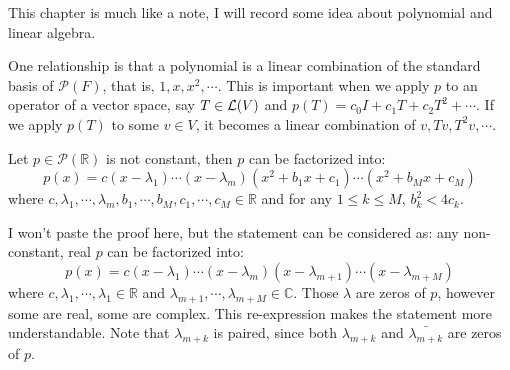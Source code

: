 \documentclass[../main.tex]{subfiles}
\begin{document}
This chapter is much like a note, I will record some idea about polynomial and linear algebra.

One relationship is that a polynomial is a linear combination of the standard basis
of $\mathcal{P}(F)$, that is, $1, x, x^2, \cdots$.
This is important when we apply $p$ to an operator of a vector space, say $T \in \mathcal{L}(V)$
and $p(T) = c_0I + c_1T + c_2T^2 + \cdots$. If we apply $p(T)$ to some $v \in V$,
it becomes a linear combination of $v, Tv, T^2v, \cdots$.

\setcounter{theorem}{15}
\begin{theorem}
  Let $p \in \mathcal{P}(\mathbb{R})$ is not constant, then $p$ can be factorized into:
  \[
  p(x) = c(x - \lambda_1) \cdots (x - \lambda_m)(x^2 + b_1x + c_1) \cdots (x^2 + b_Mx + c_M)
  \]
  where $c, \lambda_1, \cdots, \lambda_m, b_1, \cdots, b_M, c_1, \cdots, c_M \in \mathbb{R}$
  and for any $1 \le k \le M$, $b^2_k < 4 c_k$.
\end{theorem}

I won't paste the proof here, but the statement can be considered as:
any non-constant, real $p$ can be factorized into:
\[
  p(x) = c(x - \lambda_1) \cdots (x - \lambda_m) (x - \lambda_{m + 1}) \cdots (x - \lambda_{m + M})
\]
where $c, \lambda_1, \cdots, \lambda_1 \in \mathbb{R}$ and $\lambda_{m + 1}, \cdots, \lambda_{m + M} \in \mathbb{C}$.
Those $\lambda$ are zeros of $p$, however some are real, some are complex.
This re-expression makes the statement more understandable.
Note that $\lambda_{m + k}$ is paired, since both $\lambda_{m + k}$ and $\bar{\lambda_{m + k}}$ are
zeros of $p$.
\end{document}
